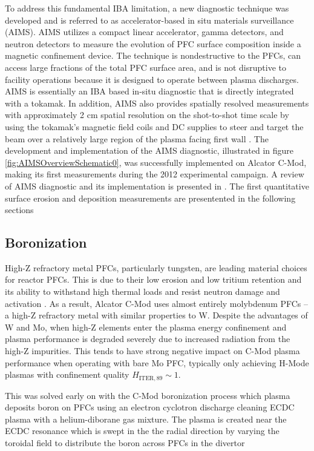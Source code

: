 \documentclass[final,3p,times,twocolumn]{elsarticle}
\begin{document}
To address this fundamental IBA limitation, a new diagnostic technique was developed and is referred to as accelerator-based in situ materials surveillance (AIMS). AIMS utilizes a compact linear accelerator, gamma detectors, and neutron detectors to measure the evolution of PFC surface composition inside a magnetic confinement device. The technique is nondestructive to the PFCs, can access large fractions of the total PFC surface area, and is not disruptive to facility operations because it is designed to operate between plasma discharges.   AIMS is essentially an IBA based in-situ diagnostic that is directly integrated with a tokamak. In addition, AIMS also provides spatially resolved measurements with approximately 2 cm spatial resolution on the shot-to-shot time scale by using the tokamak's magnetic field coils and DC supplies to steer and target the beam over a relatively large region of the plasma facing first wall \cite{RSIPaper}.  The development and implementation of the AIMS diagnostic, illustrated in figure \ref{fig:AIMSOverviewSchematic0}, was successfully implemented on Alcator C-Mod, making its first measurements during the 2012 experimental campaign.  A review of AIMS diagnostic and its implementation is presented in \cite{RSIPaper}. The first quantitative surface erosion and deposition measurements are presentented in the following sections

\subsection{Boronization}
\label{sec:BZNOverview}
High-Z refractory metal PFCs, particularly tungsten, are leading material choices for reactor PFCs.  This is due to their low erosion and low tritium retention and its ability to withstand high thermal loads and resist neutron damage and activation \cite{WWoBoronization}. As a result, Alcator C-Mod uses almost entirely molybdenum PFCs -- a high-Z refractory metal with similar properties to W.  Despite the advantages of W and Mo, when high-Z elements enter the plasma energy confinement and plasma performance is degraded severely due to increased radiation from the high-Z impurities.  This tends to have strong negative impact on C-Mod plasma performance when operating with bare Mo PFC, typically only achieving H-Mode plasmas with confinement quality $H_\mathrm{ITER,89} \sim 1$.  

This was solved early on with the C-Mod boronization process which plasma deposits boron on PFCs using an electron cyclotron discharge cleaning ECDC plasma with a helium-diborane gas mixture. The plasma is created near the ECDC resonance which is swept in the the radial direction by varying the toroidal field to distribute the boron across PFCs in the divertor%
\end{document}
